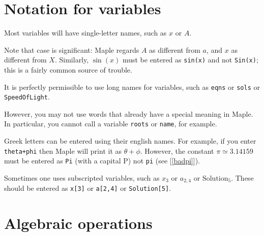 \documentclass{amsart}
\begin{document}
\section{Notation for variables}


\begin{secenum}
 \item\label{variables} Most variables will have single-letter
  names, such as $x$ or $A$. 
%
  \item\label{case} Note that case is significant: Maple regards
  $A$ as different from $a$, and $x$ as different from $X$. 
  Similarly, $\sin(x)$ must be entered as \verb~sin(x)~ and
  not \verb~Sin(x)~; this is a fairly common source of
  trouble. 
%
  \item\label{longvars} It is perfectly permissible to use long
  names for variables, such as \verb~eqns~ or \verb~sols~ or
  \verb~SpeedOfLight~. 
%
  \item\label{reserved} However, you may not use words that
  already have a special meaning in Maple.  In particular,
  you cannot call a variable \verb~roots~ or \verb~name~,
  for example. 
%
  \item\label{greek} Greek letters can be entered using
  their english names.  For example, if you enter
  \verb~theta+phi~ then Maple will print it as
  $\theta+\phi$.  However, the constant
  $\pi\simeq 3.14159$ must be entered as \verb~Pi~ (with a
  capital P) not \verb~pi~ (see [\ref{badpi}]). 
%
  \item\label{subscripts} Sometimes one uses subscripted
  variables, such as $x_3$ or $a_{2,4}$ or
  $\text{Solution}_5$.  These should be entered as
  \verb~x[3]~ or \verb~a[2,4]~ or \verb~Solution[5]~. 
\end{secenum}

\section{Algebraic operations}
\end{document}

